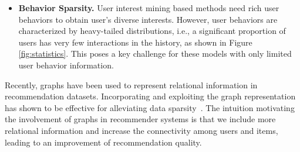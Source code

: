 \begin{itemize}
\item \textbf{Behavior Sparsity.} User interest mining based methods need rich user behaviors to obtain user's diverse interests.
However, user behaviors are characterized by heavy-tailed distributions, i.e., a significant proportion of users has very few interactions in the history, as shown in Figure \ref{fig:statistics}. This poses a key challenge  for these models with only limited user behavior information.
\end{itemize}




Recently, graphs have been used to represent relational information in recommendation datasets. Incorporating and exploiting the graph representation has shown to be effective for alleviating data sparsity~\cite{li2019graph,wang2019neural,ying2018graph}. The intuition motivating the involvement of graphs in recommender systems is that we include more relational information and increase the connectivity among users and items, leading to an improvement of recommendation quality.


